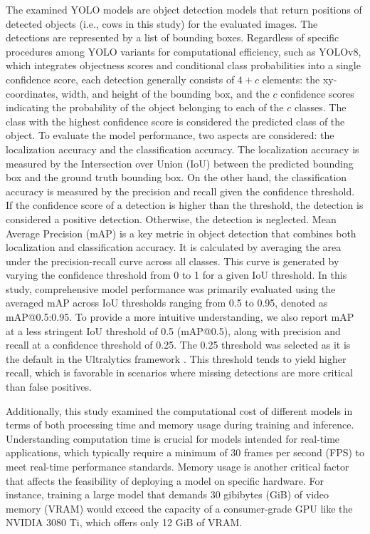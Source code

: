 The examined YOLO models are object detection models that return positions of detected objects (i.e., cows in this study) for the evaluated images. The detections are represented by a list of bounding boxes. Regardless of specific procedures among YOLO variants for computational efficiency, such as YOLOv8, which integrates objectness scores and conditional class probabilities into a single confidence score, each detection generally consists of $4+c$ elements: the xy-coordinates, width, and height of the bounding box, and the $c$ confidence scores indicating the probability of the object belonging to each of the $c$ classes. The class with the highest confidence score is considered the predicted class of the object. To evaluate the model performance, two aspects are considered: the localization accuracy and the classification accuracy. The localization accuracy is measured by the Intersection over Union (IoU) between the predicted bounding box and the ground truth bounding box. On the other hand, the classification accuracy is measured by the precision and recall given the confidence threshold. If the confidence score of a detection is higher than the threshold, the detection is considered a positive detection. Otherwise, the detection is neglected. Mean Average Precision (mAP) is a key metric in object detection that combines both localization and classification accuracy. It is calculated by averaging the area under the precision-recall curve across all classes. This curve is generated by varying the confidence threshold from 0 to 1 for a given IoU threshold. In this study, comprehensive model performance was primarily evaluated using the averaged mAP across IoU thresholds ranging from 0.5 to 0.95, denoted as mAP@0.5:0.95. To provide a more intuitive understanding, we also report mAP at a less stringent IoU threshold of 0.5 (mAP@0.5), along with precision and recall at a confidence threshold of 0.25. The 0.25 threshold was selected as it is the default in the Ultralytics framework \citep{ultralytics_yolo}. This threshold tends to yield higher recall, which is favorable in scenarios where missing detections are more critical than false positives.

Additionally, this study examined the computational cost of different models in terms of both processing time and memory usage during training and inference. Understanding computation time is crucial for models intended for real-time applications, which typically require a minimum of 30 frames per second (FPS) to meet real-time performance standards. Memory usage is another critical factor that affects the feasibility of deploying a model on specific hardware. For instance, training a large model that demands 30 gibibytes (GiB) of video memory (VRAM) would exceed the capacity of a consumer-grade GPU like the NVIDIA 3080 Ti, which offers only 12 GiB of VRAM.

